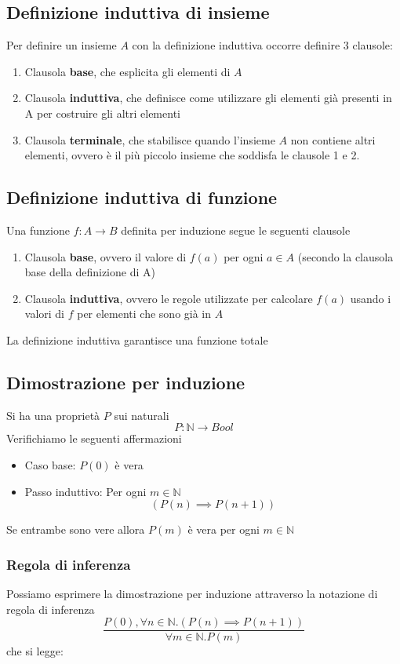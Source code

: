 \documentclass{article}
\begin{document}
\subsection{Definizione induttiva di insieme}
Per definire un insieme \(A\) con la definizione induttiva occorre definire 3 clausole:
\begin{enumerate}
    \item Clausola \textbf{base}, che esplicita gli elementi di \(A\)
    \item Clausola \textbf{induttiva}, che definisce come utilizzare gli elementi già presenti in A per costruire gli altri elementi
    \item Clausola \textbf{terminale}, che stabilisce quando l'insieme \(A\) non contiene altri elementi, ovvero è il più piccolo insieme che soddisfa le clausole 1 e 2.
\end{enumerate}

\subsection{Definizione induttiva di funzione}
Una funzione \(f: A \rightarrow B\) definita per induzione segue le seguenti clausole
\begin{enumerate}
    \item Clausola \textbf{base}, ovvero il valore di \(f(a)\) per ogni \(a \in A\) (secondo la clausola base della definizione di A)
    \item Clausola \textbf{induttiva}, ovvero le regole utilizzate per calcolare \(f(a)\) usando i valori di \(f\) per elementi che sono già in \(A\)
\end{enumerate}
La definizione induttiva garantisce una funzione totale

\subsection{Dimostrazione per induzione}
Si ha una proprietà \(P\) sui naturali
\[P: \mathbb{N} \rightarrow Bool\]
Verifichiamo le seguenti affermazioni
\begin{itemize}
    \item Caso base: \(P(0)\) è vera
    \item Passo induttivo: Per ogni \(m \in \mathbb{N}\)
          \[\left(P(n) \implies P(n + 1)\right)\]
\end{itemize}
Se entrambe sono vere allora \(P(m)\) è vera per ogni \(m \in \mathbb{N}\)

\subsubsection{Regola di inferenza}
Possiamo esprimere la dimostrazione per induzione attraverso la notazione di regola di inferenza
\[\frac{P(0), \forall n \in \mathbb{N} . \left(P(n) \implies P(n + 1)\right)}{\forall m \in \mathbb{N} . P(m)}\]
che si legge: 
\end{document}
